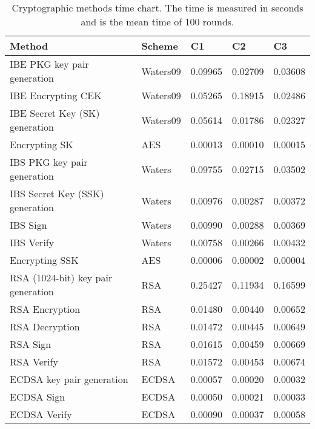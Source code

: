 \begin{table}[h]
  \begin{tabular}[c]{lllll}
  Method                                      & Scheme          & C1          & C2           & C3              \\ \hline
  IBE PKG key pair generation                 & Waters09        & 0.09965     & 0.02709      & 0.03608         \\ %
  IBE Encrypting CEK                          & Waters09        & 0.05265     & 0.18915      & 0.02486         \\ %
  IBE Secret Key (SK) generation              & Waters09        & 0.05614     & 0.01786      & 0.02327         \\ %
  Encrypting SK                               & AES             & 0.00013     & 0.00010      & 0.00015         \\ %
  IBS PKG key pair generation                 & Waters          & 0.09755     & 0.02715      & 0.03502         \\ %
  IBS Secret Key (SSK) generation             & Waters          & 0.00976     & 0.00287      & 0.00372         \\ %
  IBS Sign                                    & Waters          & 0.00990     & 0.00288      & 0.00369         \\ %
  IBS Verify                                  & Waters          & 0.00758     & 0.00266      & 0.00432         \\ %
  Encrypting SSK                              & AES             & 0.00006     & 0.00002      & 0.00004         \\ %
  RSA (1024-bit) key pair generation          & RSA             & 0.25427     & 0.11934      & 0.16599         \\ %
  RSA Encryption                              & RSA             & 0.01480     & 0.00440      & 0.00652         \\ %
  RSA Decryption                              & RSA             & 0.01472     & 0.00445      & 0.00649         \\ %
  RSA Sign                                    & RSA             & 0.01615     & 0.00459      & 0.00669         \\ %
  RSA Verify                                  & RSA             & 0.01572     & 0.00453      & 0.00674         \\ %
  ECDSA key pair generation                   & ECDSA           & 0.00057     & 0.00020      & 0.00032         \\ %
  ECDSA Sign                                  & ECDSA           & 0.00050     & 0.00021      & 0.00033         \\ %
  ECDSA Verify                                & ECDSA           & 0.00090     & 0.00037      & 0.00058         \\ %
  \end{tabular}
  \caption{Cryptographic methods time chart. The time is measured in seconds and is the mean time of 100 rounds. }
  \label{tbl:time_chart}
\end{table}



